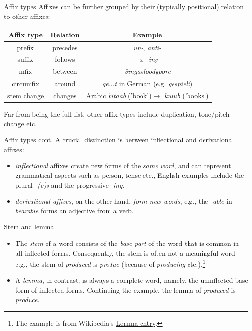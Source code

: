 \documentclass[style=upen, size=14pt]{powerdot}
\newcommand{\gold}{\color{arany}}
\begin{document}
\begin{slide}[toc=]{Affix types}
  Affixes can be further grouped by their (typically positional) relation to other
  affixes:\smallskip
  \begin{center}
    \small
    \begin{tabular}{ c c c }
      \hline
      Affix type & Relation  & Example \\
      \hline
      prefix & precedes & \emph{un-}, \emph{anti-} \\
      suffix & follows & \emph{-s}, \emph{-ing} \\
      infix & between & \emph{Singa{\gold bloody}pore} \\
      circumfix & around & \emph{ge...t} in German (e.g. \emph{gespielt}) \\  
      stem change & changes & Arabic \emph{kitaab} ('book')$\rightarrow$ \emph{kutub} ('books')
    \end{tabular}
  \end{center}\bigskip
  Far from being the full list, other affix types include duplication,
  tone/pitch change etc.
\end{slide}

\begin{slide}[toc=]{Affix types cont.}
  A crucial distinction is between inflectional and derivational affixes:
  \begin{itemize}
  \item \emph{\gold inflectional} affixes create new forms of the \emph{same
      word}, and can represent grammatical aspects such as person, tense etc.,
    English examples include the plural \emph{-(e)s} and the progressive \emph{-ing}.
  \item \emph{\gold derivational affixes}, on the other hand, \emph{form new
      words}, e.g., the \emph{-able} in \emph{bearable} forms an adjective from
    a verb.
  \end{itemize}
\end{slide}

\begin{slide}[toc=]{Stem and lemma}
  \begin{itemize}
  \item The \emph{\gold stem} of a word consists of the \emph{base part} of the
    word that is common in all inflected forms. Consequently, the stem is often
    not a meaningful word, e.g., the stem of \emph{produced} is \emph{produc}
    (because of \emph{producing} etc.).\footnote{The example is from Wikipedia's
      \href{https://en.wikipedia.org/wiki/Lemma_(morphology)}{Lemma entry}.}
\item A \emph{\gold lemma}, in contrast, is always a complete word, namely, the
  uninflected base form of inflected forms. Continuing the example, the lemma of
  \emph{produced} is \emph{produce}.
  \end{itemize}
\end{slide}
\end{document}
